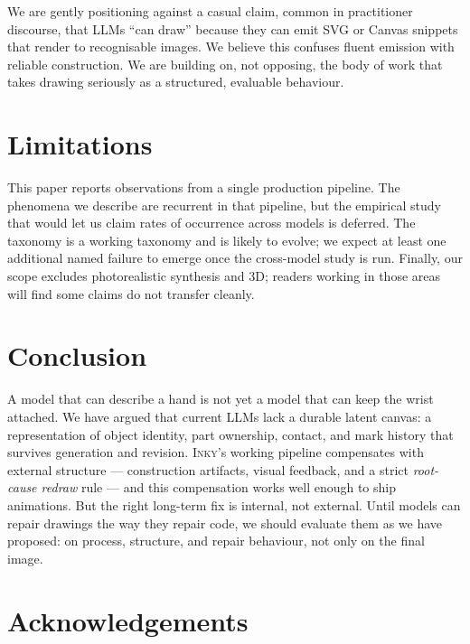 \documentclass[10pt,twocolumn]{article}
\newcommand{\inky}{\textsc{Inky}}
\begin{document}
We are gently positioning against a casual claim, common in
practitioner discourse, that LLMs ``can draw'' because they can emit
SVG or Canvas snippets that render to recognisable images. We
believe this confuses fluent emission with reliable construction. We
are building on, not opposing, the body of work that takes drawing
seriously as a structured, evaluable behaviour.

\section{Limitations}

This paper reports observations from a single production pipeline.
The phenomena we describe are recurrent in that pipeline, but the
empirical study that would let us claim rates of occurrence across
models is deferred. The taxonomy is a working taxonomy and is likely
to evolve; we expect at least one additional named failure to emerge
once the cross-model study is run. Finally, our scope excludes
photorealistic synthesis and 3D; readers working in those areas will
find some claims do not transfer cleanly.

\section{Conclusion}

A model that can describe a hand is not yet a model that can keep the
wrist attached. We have argued that current LLMs lack a durable
latent canvas: a representation of object identity, part ownership,
contact, and mark history that survives generation and revision.
\inky{}'s working pipeline compensates with external structure ---
construction artifacts, visual feedback, and a strict
\emph{root-cause redraw} rule --- and this compensation works well
enough to ship animations. But the right long-term fix is internal,
not external. Until models can repair drawings the way they repair
code, we should evaluate them as we have proposed: on process,
structure, and repair behaviour, not only on the final image.

\section*{Acknowledgements}
\end{document}
